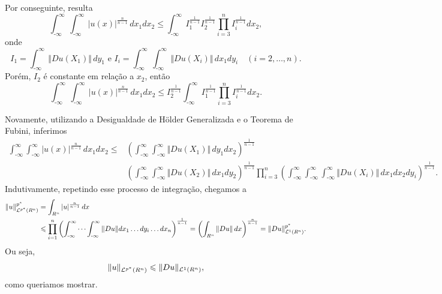 \documentclass[xcolor=dvipsnames, aspectratio=169, 10pt]{beamer}
\let\mathbb\relax
\newcommand{\m}{\text{-}}
\newcommand{\bR}{\mathbb{R}}
\newcommand{\cL}{\mathcal{L}}
\begin{document}
\begin{frame}
    Por conseguinte, resulta
    \[
        \int_{\m\infty}^{\infty}\int_{\m\infty}^{\infty} |u(x)|^{\frac{n}{n-1}} \,dx_1dx_2 \leqslant \int_{\m\infty}^{\infty} I_1^{\frac{1}{n-1}}I_2^{\frac{1}{n-1}}\prod_{i=3}^n I_i^{\frac{1}{n-1}} dx_2,
    \]
    onde
    \[
        I_1 = \int_{\m\infty}^{\infty} \Vert Du(X_1)\Vert \,dy_1 \text{ e } I_i = \int_{\m\infty}^{\infty} \!\int_{\m\infty}^{\infty} \Vert Du(X_i) \Vert \, dx_1dy_i \quad(i = 2,\dots,n).
    \]
    Porém, $I_2$ é constante em relação a $x_2$, então
    \[
        \int_{\m\infty}^{\infty}\int_{\m\infty}^{\infty} |u(x)|^{\frac{n}{n-1}} \,dx_1dx_2 \leqslant I_2^{\frac{1}{n-1}}\int_{\m\infty}^{\infty} I_1^{\frac{1}{n-1}}\prod_{i=3}^n I_i^{\frac{1}{n-1}} dx_2.
    \]
\end{frame}
\begin{frame}
    Novamente, utilizando a Desigualdade de Hölder Generalizada e o Teorema de Fubini, inferimos
    {\small
    \[
        \begin{aligned}
            \int_{\m\infty}^{\infty}\int_{\m\infty}^{\infty} |u(x)|^{\frac{n}{n-1}} \,dx_1dx_2 \leqslant &\left( \int_{\m\infty}^{\infty} \int_{\m\infty}^{\infty} \Vert Du(X_1) \Vert \,dy_1 dx_2 \right)^{\frac{1}{n-1}}\\ &\left( \int_{\m\infty}^{\infty} \int_{\m\infty}^{\infty} \Vert Du(X_2) \Vert \,dx_1 dy_2 \right)^{\frac{1}{n-1}} \prod_{i=3}^n \left( \int_{\m\infty}^{\infty}\int_{\m\infty}^{\infty}\int_{\m\infty}^{\infty} \Vert Du(X_i) \Vert \,dx_1dx_2dy_i \right)^{\frac{1}{n-1}} \!\!.
        \end{aligned}
    \]\!}
    Indutivamente, repetindo esse processo de integração, chegamos a
    \[
        \begin{aligned}
            \Vert u \Vert_{\cL^{p^*}(\bR^n)}^{p^*} &= \int_{\bR^n} |u|^{\frac{n}{n-1}} \, dx \\
            &\leqslant \prod_{i=1}^n \left( \int_{\m\infty}^{\infty} \cdots \int_{\m\infty}^\infty \Vert Du \Vert dx_1\dots dy_i \dots dx_n \right)^{\frac{1}{n-1}}
            = \left(\int_{\bR^n} \Vert Du \Vert\,dx\right)^{\frac{n}{n-1}} = \Vert Du \Vert_{\cL^1(\bR^n)}^{p^*}.
        \end{aligned}
    \]
    Ou seja,
    \begin{equation} \label{eq:desigualdadegnss}
        \Vert u \Vert_{\cL^{p^*}(\bR^n)} \leqslant\Vert Du \Vert_{\cL^1(\bR^n)},
    \end{equation}
    como queriamos mostrar.
\end{frame}
\end{document}
